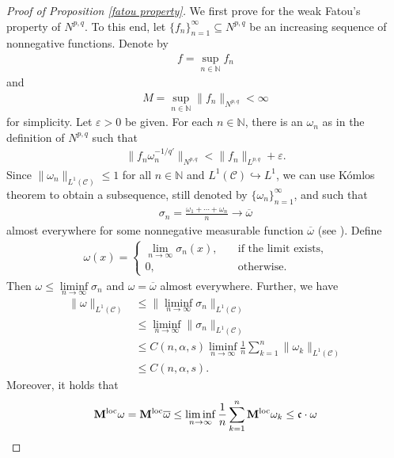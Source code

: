 \documentclass[10pt,reqno]{amsart}
\numberwithin{equation}{section}
\begin{document}
\begin{proof}[Proof of Proposition \ref{fatou property}]
We first prove for the weak Fatou's property of $N^{p,q}$. To this end, let $\{f_{n}\}_{n=1}^{\infty}\subseteq N^{p,q}$ be an increasing sequence of nonnegative functions. Denote by 
\begin{align*}
f=\sup\limits_{n\in\mathbb{N}}f_{n}
\end{align*}
and
\begin{align*}
M=\sup_{n\in\mathbb{N}}\|f_{n}\|_{N^{p,q}}<\infty
\end{align*}
for simplicity. Let $\varepsilon>0$ be given. For each $n\in\mathbb{N}$, there is an $\omega_{n}$ as in the definition of $N^{p,q}$ such that 
\begin{align*}
\|f_{n}\omega_{n}^{-1/q'}\|_{N^{p,q}}<\|f_{n}\|_{L^{p,q}}+\varepsilon.
\end{align*}
Since $\|\omega_{n}\|_{L^{1}(\mathcal{C})}\leq 1$ for all $n\in\mathbb{N}$ and $L^{1}(\mathcal{C})\hookrightarrow L^{1}$, we can use K\'omlos theorem to obtain a subsequence, still denoted by $\{\omega_{n}\}_{n=1}^{\infty}$, and such that
\begin{align*}
\sigma_{n}=\frac{\omega_{1}+\cdots+\omega_{n}}{n}\rightarrow\overline{\omega}
\end{align*}
almost everywhere for some nonnegative measurable function $\overline{\omega}$ (see \cite[Theorem 3.1]{DL}). Define
\begin{align*}
\omega(x)=\begin{cases}
\lim_{n\rightarrow\infty}\sigma_{n}(x),\quad&\text{if the limit exists},\\
0,\quad&\text{otherwise}.
\end{cases}
\end{align*}
Then $\omega\leq\liminf\limits_{n\rightarrow\infty}\sigma_{n}$ and $\omega=\overline{\omega}$ almost everywhere. Further, we have 
\begin{align*}
\|\omega\|_{L^{1}(\mathcal{C})}&\leq\|\liminf_{n\rightarrow\infty}\sigma_{n}\|_{L^{1}(\mathcal{C})}\\
&\leq\liminf_{n\rightarrow\infty}\|\sigma_{n}\|_{L^{1}(\mathcal{C})}\\
&\leq C(n,\alpha,s)\liminf_{n\rightarrow\infty}\frac{1}{n}\sum_{k=1}^{n}\|\omega_{k}\|_{L^{1}(\mathcal{C})}\\
&\leq C(n,\alpha,s).
\end{align*}
Moreover, it holds that 
\begin{align*}
{\bf M}^{\rm loc}\omega={\bf M}^{\rm loc}\overline{\omega}\leq\liminf_{n\rightarrow\infty}\frac{1}{n}\sum_{k=1}^{n}{\bf M}^{\rm loc}\omega_{k}\leq\mathfrak{c}\cdot\omega

\end{align*}
\end{proof}
\end{document}
